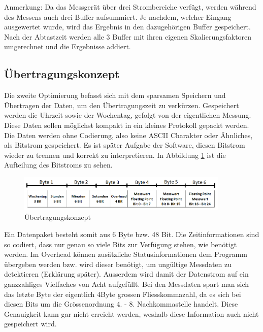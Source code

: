 Anmerkung: Da das Messgerät über drei Strombereiche verfügt, werden während des Messens auch drei Buffer aufsummiert. Je nachdem, welcher Eingang ausgewertet wurde, wird das Ergebnis in den dazugehörigen Buffer gespeichert. Nach der Abtastzeit werden alle 3 Buffer mit ihren eigenen Skalierungsfaktoren umgerechnet und die Ergebnisse addiert.

\subsection{Übertragungskonzept}\label{subsec:Übertragungskonzept}

Die zweite Optimierung befasst sich mit dem sparsamen Speichern und Übertragen der Daten, um den Übertragungszeit zu verkürzen. Gespeichert werden die Uhrzeit sowie der Wochentag, gefolgt von der eigentlichen Messung. Diese Daten sollen möglichst kompakt in ein kleines Protokoll gepackt werden. Die Daten werden ohne Codierung, also keine ASCII Charakter oder Ähnliches, als Bitstrom gespeichert. Es ist später Aufgabe der Software, diesen Bitstrom wieder zu trennen und korrekt zu interpretieren. In Abbildung \ref{fig:Übertragungskonzept} ist die Aufteilung des Bitstroms zu sehen.

\begin{figure}[H]
\begin{center}
\includegraphics[width=0.9\textwidth]{images/Software_uebertragung.png}
\caption{Übertragungskonzept}
\label{fig:Übertragungskonzept}
\end{center}
\end{figure}

Ein Datenpaket besteht somit aus 6 Byte bzw. 48 Bit. Die Zeitinformationen sind so codiert, dass nur genau so viele Bits zur Verfügung stehen, wie benötigt werden. Im Overhead können zusätzliche Statusinformationen dem Programm übergeben werden bzw. wird dieser benötigt, um ungültige Messdaten zu detektieren (Erklärung später). Ausserdem wird damit der Datenstrom auf ein ganzzahliges Vielfaches von Acht aufgefüllt. Bei den Messdaten spart man sich das letzte Byte der eigentlich 4Byte grossen Fliesskommazahl, da es sich bei diesen Bits um die Grössenordnung 4. - 8. Nachkommastelle handelt. Diese Genauigkeit kann gar nicht erreicht werden, weshalb diese Information auch nicht gespeichert wird.

